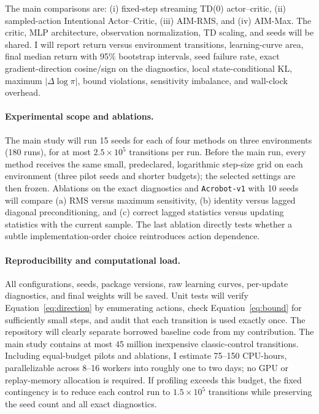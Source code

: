 \documentclass{article}
\begin{document}
The main comparisons are: (i) fixed-step streaming TD(0) actor--critic, (ii) sampled-action Intentional Actor--Critic, (iii) AIM-RMS, and (iv) AIM-Max. The critic, MLP architecture, observation normalization, TD scaling, and seeds will be shared. I will report return versus environment transitions, learning-curve area, final median return with 95\% bootstrap intervals, seed failure rate, exact gradient-direction cosine/sign on the diagnostics, local state-conditional KL, maximum $|\Delta\log\pi|$, bound violations, sensitivity imbalance, and wall-clock overhead.

\paragraph{Experimental scope and ablations.}
The main study will run 15 seeds for each of four methods on three environments (180 runs), for at most $2.5\times10^5$ transitions per run. Before the main run, every method receives the same small, predeclared, logarithmic step-size grid on each environment (three pilot seeds and shorter budgets); the selected settings are then frozen. Ablations on the exact diagnostics and \texttt{Acrobot-v1} with 10 seeds will compare (a) RMS versus maximum sensitivity, (b) identity versus lagged diagonal preconditioning, and (c) correct lagged statistics versus updating statistics with the current sample. The last ablation directly tests whether a subtle implementation-order choice reintroduces action dependence.

\paragraph{Reproducibility and computational load.}
All configurations, seeds, package versions, raw learning curves, per-update diagnostics, and final weights will be saved. Unit tests will verify Equation~\ref{eq:direction} by enumerating actions, check Equation~\ref{eq:bound} for sufficiently small steps, and audit that each transition is used exactly once. The repository will clearly separate borrowed baseline code from my contribution. The main study contains at most 45 million inexpensive classic-control transitions. Including equal-budget pilots and ablations, I estimate 75--150 CPU-hours, parallelizable across 8--16 workers into roughly one to two days; no GPU or replay-memory allocation is required. If profiling exceeds this budget, the fixed contingency is to reduce each control run to $1.5\times10^5$ transitions while preserving the seed count and all exact diagnostics.
\end{document}
